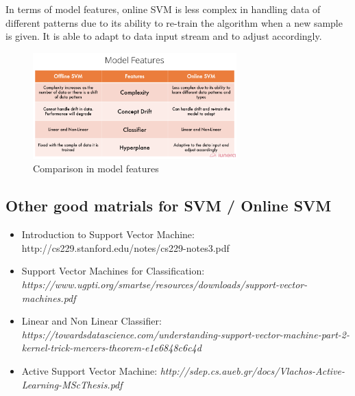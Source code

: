 \documentclass[11pt]{article}
\begin{document}
In terms of model features, online SVM is less complex in handling data of different patterns due to its ability to re-train the algorithm when a new sample is given. It is able to adapt to data input stream and to adjust accordingly.

\begin{figure}[H]
\centering
\includegraphics[width=0.7\textwidth]{com2.png}
\caption{Comparison in model features}
\label{fig:com2}
\end{figure}


\subsection{Other good matrials for SVM / Online SVM}
\begin{itemize}
    \item Introduction to Support Vector Machine: http://cs229.stanford.edu/notes/cs229-notes3.pdf
    \item Support Vector Machines for Classification: \textit{https://www.ugpti.org/smartse/resources/downloads/support-vector-machines.pdf}
    \item Linear and Non Linear Classifier: \textit{https://towardsdatascience.com/understanding-support-vector-machine-part-2-kernel-trick-mercers-theorem-e1e6848c6c4d}
    \item Active Support Vector Machine: \textit{http://sdep.cs.aueb.gr/docs/Vlachos-Active-Learning-MScThesis.pdf}
\end{itemize}



{


}


\end{document}
